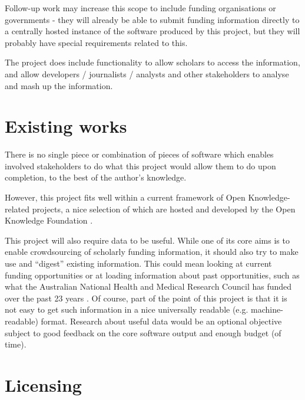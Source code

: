 Follow-up work may increase this scope to include funding organisations or governments - they will already be able to submit funding information directly to a centrally hosted instance of the software produced by this project, but they will probably have special requirements related to this.

The project does include functionality to allow scholars to access the information, and allow developers / journalists / analysts and other stakeholders to analyse and mash up the information.

\section{Existing works}
There is no single piece or combination of pieces of software which enables involved stakeholders to do what this project would allow them to do upon completion, to the best of the author's knowledge.

However, this project fits well within a current framework of Open Knowledge-related projects, a nice selection of which are hosted and developed by the Open Knowledge Foundation \cite{okfn-labs} \cite{okfn-github}.

This project will also require data to be useful. While one of its core aims is to enable crowdsourcing of scholarly funding information, it should also try to make use and ``digest'' existing information. This could mean looking at current funding opportunities \cite{rcuk-india} \cite{ahrc-opps} \cite{bbsrc-opps} \cite{epsrc-opps} or at loading information about past opportunities, such as what the Australian National Health and Medical Research Council has funded over the past 23 years \cite{au-nhmrc}. Of course, part of the point of this project is that it is not easy to get such information in a nice universally readable (e.g. machine-readable) format. Research about useful data would be an optional objective subject to good feedback on the core software output and enough budget (of time).

\section{Licensing}

